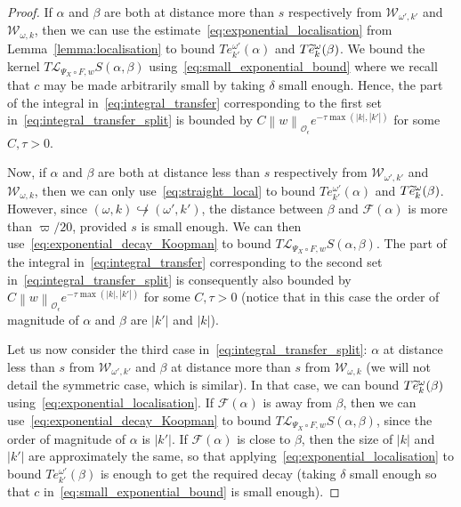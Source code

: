 \documentclass[AHL,Unicode,longabstracts,published]{cedram}
\newcommand{\n}[1]{\left\|#1\right\|}
\newcommand{\va}[1]{\left|#1\right|}
\newcommand{\clO}{\mathcal{O}}
\newcommand{\clL}{\mathcal{L}}
\newcommand{\clF}{\mathcal{F}}
\newcommand{\clW}{\mathcal{W}}
\let\oldtilde\tilde
\renewcommand*{\tilde}[1]{\mathchoice{\widetilde{#1}}{\widetilde{#1}}{\oldtilde{#1}}{\oldtilde{#1}}}
\newcommand{\clO}{\mathcal{O}}
\begin{document}
\begin{proof}
If $\alpha$ and $\beta$ are both at distance more than $s$ respectively from $\clW_{\omega',k'}$ and $\clW_{\omega,k}$, then we can use the estimate~\eqref{eq:exponential_localisation} from Lemma~\ref{lemma:localisation} to bound $T e_{k'}^{\omega'} (\alpha)$ and $T \tilde{e}_{k}^{\omega}(\beta)$. We bound the kernel $T \clL_{\Psi_X \circ F,w} S(\alpha,\beta)$ using~\eqref{eq:small_exponential_bound} where we recall that $c$ may be made arbitrarily small by taking $\delta$ small enough. Hence, the part of the integral in~\eqref{eq:integral_transfer} corresponding to the first set in~\eqref{eq:integral_transfer_split} is bounded by $C \n{w}_{\clO_\epsilon} e^{- \tau \max(\va{k},\va{k'})}$ for some $C,\tau > 0$.

Now, if $\alpha$ and $\beta$ are both at distance less than $s$ respectively from $\clW_{\omega',k'}$ and $\clW_{\omega,k}$, then we can only use~\eqref{eq:straight_local} to bound $T e_{k'}^{\omega'} (\alpha)$ and $T \tilde{e}_{k}^{\omega}(\beta)$. However, since $(\omega,k) \not\hookrightarrow (\omega',k')$, the distance between $\beta$ and $\clF(\alpha)$ is more than $ \varpi/20$, provided $s$ is small enough. We can then use~\eqref{eq:exponential_decay_Koopman} to bound $T \clL_{\Psi_X \circ F,w} S(\alpha,\beta)$. The part of the integral in~\eqref{eq:integral_transfer} corresponding to the second set in~\eqref{eq:integral_transfer_split} is consequently also bounded by $C \n{w}_{\clO_\epsilon} e^{- \tau \max(\va{k},\va{k'})}$ for some $C,\tau > 0$ (notice that in this case the order of magnitude of $\alpha$ and $\beta$ are $|k'|$ and $|k|$).

Let us now consider the third case in~\eqref{eq:integral_transfer_split}: $\alpha$ at distance less than $s$ from $\clW_{\omega',k'}$ and $\beta$ at distance more than $s$ from $\clW_{\omega,k}$ (we will not detail the symmetric case, which is similar). In that case, we can bound $T \tilde{e}_{k}^{\omega}(\beta)$ using~\eqref{eq:exponential_localisation}. If $\clF(\alpha)$ is away from $\beta$, then we can use~\eqref{eq:exponential_decay_Koopman} to bound $T \clL_{\Psi_X \circ F,w} S(\alpha,\beta)$, since the order of magnitude of $\alpha$ is $|k'|$. If $\clF(\alpha)$ is close to $\beta$, then the size of $\va{k}$ and $\va{k'}$ are approximately the same, so that applying~\eqref{eq:exponential_localisation} to bound $T e_{k'}^{\omega'}(\beta)$ is enough to get the required decay (taking $\delta$ small enough so that $c$ in~\eqref{eq:small_exponential_bound} is small enough).
\end{proof}
\end{document}
